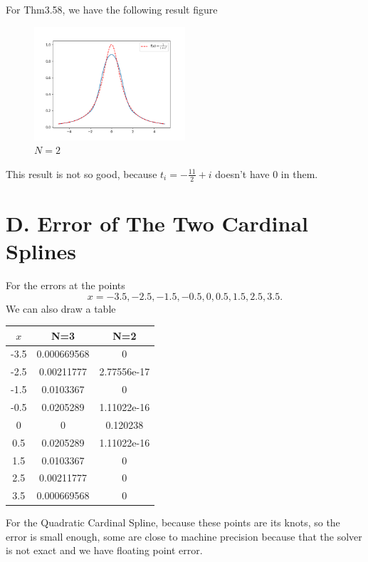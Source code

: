 \documentclass[a4paper]{article}
\begin{document}
For Thm3.58, we have the following result figure
\begin{figure}[H]
    \centering
    \includegraphics[width=0.5\textwidth]{../figure/C_2.png}
    \caption{$N=2$}
\end{figure}
This result is not so good, because $t_i = -\frac{11}{2} + i$ doesn't have $0$ in them.

\section{D. Error of The Two Cardinal Splines}

For the errors at the points
\begin{equation}
    x = -3.5, -2.5, -1.5, -0.5, 0, 0.5, 1.5, 2.5, 3.5.
\end{equation}
We can also draw a table
\begin{table}[H]
    \centering
    \begin{tabular}{|c|c|c|}
        \hline
        $x$ & N=3 & N=2 \\
        \hline
        -3.5 & 0.000669568 & 0 \\
        -2.5 & 0.00211777 & 2.77556e-17 \\
        -1.5 & 0.0103367 & 0 \\
        -0.5 & 0.0205289 & 1.11022e-16 \\
        0 & 0 & 0.120238 \\
        0.5 & 0.0205289 & 1.11022e-16 \\
        1.5 & 0.0103367 & 0 \\
        2.5 & 0.00211777 & 0 \\
        3.5 & 0.000669568 & 0 \\
        \hline
    \end{tabular}
\end{table}

For the Quadratic Cardinal Spline, because these points are its knots, so the error is small enough, 
some are close to machine precision because that the solver is not exact and we have floating point error.
\end{document}
